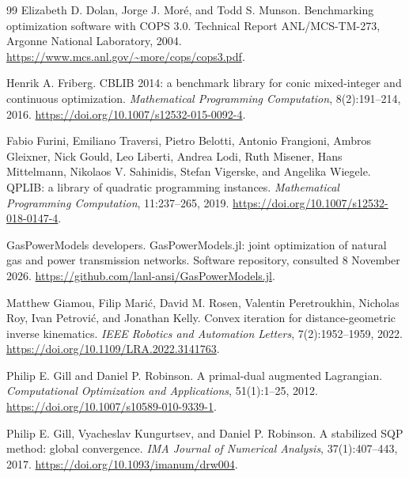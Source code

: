 \documentclass[pdflatex,sn-mathphys-num]{sn-jnl}
\theoremstyle{thmstyleone}
\theoremstyle{thmstylethree}
\begin{document}
\begin{thebibliography}{99}
Elizabeth D. Dolan, Jorge J. Mor\'e, and Todd S. Munson.
\newblock Benchmarking optimization software with COPS 3.0.
\newblock Technical Report ANL/MCS-TM-273, Argonne National Laboratory, 2004.
\newblock \url{https://www.mcs.anl.gov/~more/cops/cops3.pdf}.

Henrik A. Friberg.
\newblock CBLIB 2014: a benchmark library for conic mixed-integer and continuous optimization.
\newblock \emph{Mathematical Programming Computation}, 8(2):191--214, 2016.
\newblock \url{https://doi.org/10.1007/s12532-015-0092-4}.

Fabio Furini, Emiliano Traversi, Pietro Belotti, Antonio Frangioni, Ambros Gleixner,
Nick Gould, Leo Liberti, Andrea Lodi, Ruth Misener, Hans Mittelmann,
Nikolaos V. Sahinidis, Stefan Vigerske, and Angelika Wiegele.
\newblock QPLIB: a library of quadratic programming instances.
\newblock \emph{Mathematical Programming Computation}, 11:237--265, 2019.
\newblock \url{https://doi.org/10.1007/s12532-018-0147-4}.

GasPowerModels developers.
\newblock GasPowerModels.jl: joint optimization of natural gas and power transmission networks.
\newblock Software repository, consulted 8 November 2026.
\newblock \url{https://github.com/lanl-ansi/GasPowerModels.jl}.

Matthew Giamou, Filip Mari\'c, David M. Rosen, Valentin Peretroukhin,
Nicholas Roy, Ivan Petrovi\'c, and Jonathan Kelly.
\newblock Convex iteration for distance-geometric inverse kinematics.
\newblock \emph{IEEE Robotics and Automation Letters}, 7(2):1952--1959, 2022.
\newblock \url{https://doi.org/10.1109/LRA.2022.3141763}.

Philip E. Gill and Daniel P. Robinson.
\newblock A primal-dual augmented Lagrangian.
\newblock \emph{Computational Optimization and Applications}, 51(1):1--25, 2012.
\newblock \url{https://doi.org/10.1007/s10589-010-9339-1}.

Philip E. Gill, Vyacheslav Kungurtsev, and Daniel P. Robinson.
\newblock A stabilized SQP method: global convergence.
\newblock \emph{IMA Journal of Numerical Analysis}, 37(1):407--443, 2017.
\newblock \url{https://doi.org/10.1093/imanum/drw004}.


\end{thebibliography}
\end{document}
